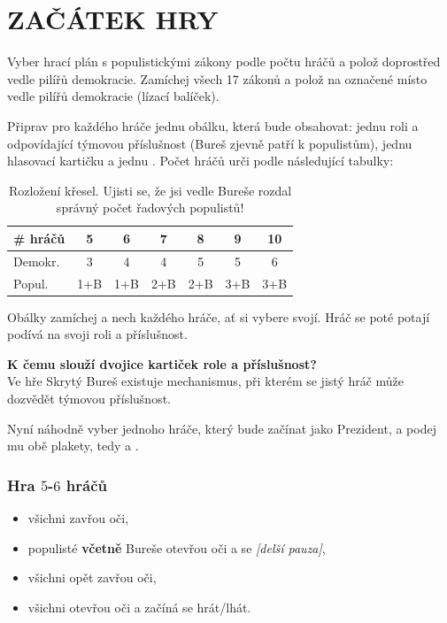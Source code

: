 \documentclass{article}
\newenvironment{redbox}{
    \color{red}\it
}
{
    \normalsize
}
\begin{document}
\section*{ZAČÁTEK HRY}

    Vyber hrací plán s populistickými zákony podle počtu hráčů a polož doprostřed vedle pilířů demokracie. Zamíchej všech 17 zákonů a polož na označené místo vedle pilířů demokracie (lízací balíček).

    Připrav pro každého hráče jednu obálku, kte\-rá bude obsahovat: jednu roli a odpovídající týmovou příslušnost (Bureš zjevně patří k populistům), jednu hlasovací kartičku  a jednu . Počet hráčů urči podle následující tabulky:
    \begin{table}[h]
    \sffamily
    \setlength{\tabcolsep}{3pt}
    \renewcommand{\arraystretch}{1.2}
    \begin{tabular}{l|c|c|c|c|c|c}
        \# hráčů & 5 & 6 & 7 & 8 & 9 & 10 \\\hline
        Demokr. & 3 & 4 & 4 & 5 & 5 & 6 \\
        Popul. & 1+B & 1+B & 2+B & 2+B & 3+B & 3+B
    \end{tabular}
    \caption{Rozložení křesel. Ujisti se, že jsi vedle Bureše rozdal správný počet řadových populistů!}
    \end{table}

    Obálky zamíchej a nech každého hráče, ať si vybere svojí. Hráč se poté potají podívá na svoji roli a příslušnost.

    \begin{redbox}
        \textbf{K čemu slouží dvojice kartiček role a pří\-sluš\-nost?}\\[.5em]
        Ve hře Skrytý Bureš existuje mechanismus, při kterém se jistý hráč může dozvědět týmovou pří\-sluš\-nost. %
    \end{redbox}

    Nyní náhodně vyber jednoho hráče, který bude začínat jako Prezident, a podej mu obě plakety, tedy  a .

    \subsubsection*{Hra $5$-$6$ hráčů}
    \begin{itemize}
        \item všichni zavřou oči,
        \item populisté \textbf{včetně} Bureše otevřou oči a  se {\it [delší pauza]},
        \item všichni opět zavřou oči,
        \item všichni otevřou oči a začíná se hrát/lhát.
    \end{itemize}
\end{document}
